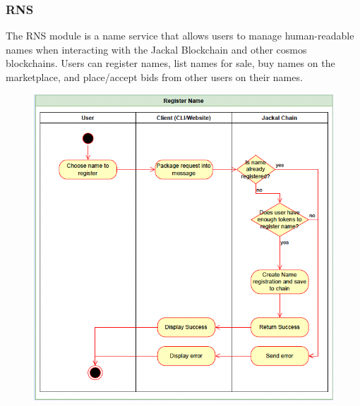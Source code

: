 \documentclass[a4paper]{article}
\begin{document}
\subsubsection{RNS}
The RNS module is a name service that allows users to manage human-readable names when interacting with the Jackal Blockchain and other cosmos blockchains. Users can register names, list names for sale, buy names on the marketplace, and place/accept bids from other users on their names.
\begin{figure}[!htbp]
\centering
{}
\end{figure}

\begin{figure}[!htbp]
\centering
\includegraphics[width=1\textwidth]{assets/rns2.png}
\caption{}
\end{figure}
\end{document}
